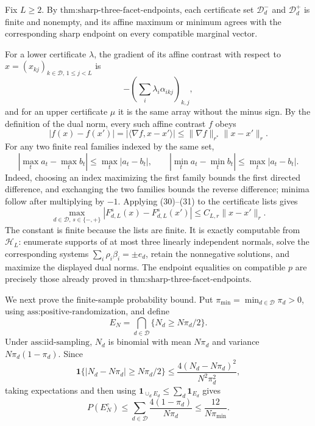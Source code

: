 Fix \(L\geq2\).  By \(\text{thm:sharp-three-facet-endpoints}\), each certificate set \(\mathcal D_d^-\) and \(\mathcal D_d^+\) is finite and nonempty, and its affine maximum or minimum agrees with the corresponding sharp endpoint on every compatible marginal vector.

For a lower certificate \(\lambda\), the gradient of its affine contrast with respect to \(x=(x_{kj})_{k\in\mathcal D,\,1\leq j<L}\) is
\[
 -\left(\sum_i\lambda_i\alpha_{ikj}\right)_{k,j},
\]
and for an upper certificate \(\mu\) it is the same array without the minus sign.  By the definition of the dual norm, every such affine contrast \(f\) obeys
\[
 |f(x)-f(x')|
 =|\langle\nabla f,x-x'\rangle|
 \leq\|\nabla f\|_{r^*}\|x-x'\|_r.                                      \tag{30}
\]
For any two finite real families indexed by the same set,
\[
 \left|\max_t a_t-\max_t b_t\right|\leq\max_t|a_t-b_t|,
 \qquad
 \left|\min_t a_t-\min_t b_t\right|\leq\max_t|a_t-b_t|.                 \tag{31}
\]
Indeed, choosing an index maximizing the first family bounds the first directed difference, and exchanging the two families bounds the reverse difference; minima follow after multiplying by \(-1\).  Applying (30)--(31) to the certificate lists gives
\[
 \max_{d\in\mathcal D,\,s\in\{-,+\}}
 |F_{d,L}^s(x)-F_{d,L}^s(x')|
 \leq C_{L,r}\|x-x'\|_r.                                                  \tag{32}
\]
The constant is finite because the lists are finite.  It is exactly computable from \(\mathcal H_L\): enumerate supports of at most three linearly independent normals, solve the corresponding systems \(\sum_i\rho_i\beta_i=\pm e_d\), retain the nonnegative solutions, and maximize the displayed dual norms.  The endpoint equalities on compatible \(p\) are precisely those already proved in \(\text{thm:sharp-three-facet-endpoints}\).

We next prove the finite-sample probability bound.  Put \(\pi_{\min}=\min_{d\in\mathcal D}\pi_d>0\), using \(\text{ass:positive-randomization}\), and define
\[
 E_N=\bigcap_{d\in\mathcal D}\{N_d\geq N\pi_d/2\}.
\]
Under \(\text{ass:iid-sampling}\), \(N_d\) is binomial with mean \(N\pi_d\) and variance \(N\pi_d(1-\pi_d)\).  Since
\[
 \mathbf 1\{|N_d-N\pi_d|\geq N\pi_d/2\}
 \leq \frac{4(N_d-N\pi_d)^2}{N^2\pi_d^2},
\]
taking expectations and then using \(\mathbf 1_{\cup_d E_d}\leq\sum_d\mathbf 1_{E_d}\) gives
\[
 P(E_N^c)
 \leq\sum_{d\in\mathcal D}\frac{4(1-\pi_d)}{N\pi_d}
 \leq\frac{12}{N\pi_{\min}}.                                              \tag{33}
\]

